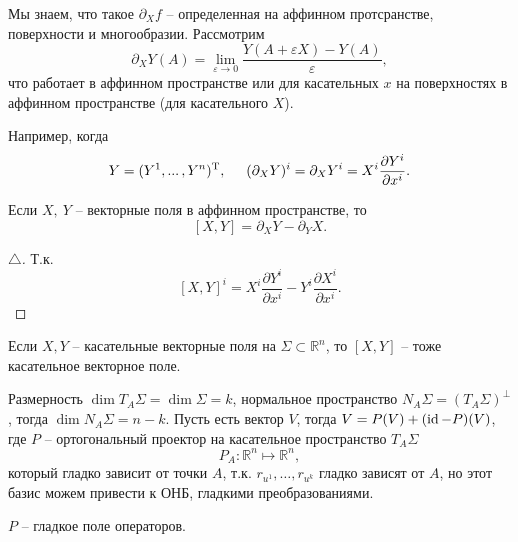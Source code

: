 Мы знаем, что такое $\partial_X f$ -- определенная на аффинном протсранстве, поверхности и многообразии. Рассмотрим
\begin{equation*}
    \partial_X Y (A) = \lim_{\varepsilon \to 0} \frac{Y(A + \varepsilon X) - Y(A)}{\varepsilon},
\end{equation*}
что работает в аффинном пространстве или для касательных $x$ на поверхностях в аффинном пространстве (для касательного $X$). 

Например, когда 
\begin{equation*}
    Y = ({Y}^{1}, ... \,, {Y}^{n})^{\text{T}},
    \hspace{0.5cm} 
    (\partial_X Y)^i = \partial_X Y^i = X^i \frac{\partial Y^i}{\partial x^i}.
\end{equation*}

\begin{to_con} 
    Если $X, \ Y$ -- векторные поля в аффинном пространстве, то
    \begin{equation*}
         \left[X, Y\right] = \partial_X Y - \partial_Y X.
     \end{equation*} 
\end{to_con}

\begin{proof}[$\triangle$]
    Т.к.
\begin{equation*}
    \left[X, Y\right]^i = X^i \frac{\partial Y^i}{\partial x^i} - Y^i \frac{\partial X^i}{\partial x^i}.
\end{equation*}
\end{proof}

\begin{to_lem} 
    Если $X, Y$ -- касательные векторные поля на $\Sigma \subset \mathbb{R}^n$, то $[X, Y]$ -- тоже касательное векторное поле. 
\end{to_lem}

Размерность $\dim T_A \Sigma = \dim \Sigma = k$, нормальное пространство $N_A \Sigma = \left(T_A \Sigma\right)^{\bot}$, тогда $\dim N_A \Sigma = n - k$. Пусть есть вектор $V$, тогда $V = P(V) + (\mathop{\mathrm{id}}\nolimits - P)(V)$, где $P$ -- ортогональный проектор на касательное пространство $T_A \Sigma$
\begin{equation}
    P_A \colon \mathbb{R}^n  \mapsto \mathbb{R}^n,
\end{equation}
который гладко зависит от точки $A$, т.к. $r_{u^1}, \ldots, r_{u^k}$ гладко зависят от $A$, но этот базис можем привести к ОНБ, гладкими преобразованиями. 

\begin{to_lem} 
    $P$ -- гладкое поле операторов. 
\end{to_lem}


